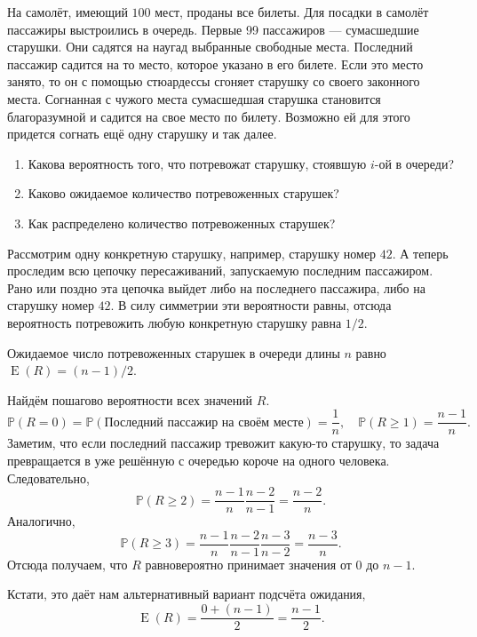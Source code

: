 \documentclass[nobib]{tufte-handout}
\theoremstyle{definition}
\newcounter{problem}
\newenvironment{problem}%
{%
\refstepcounter{problem}%
     \hypertarget{problem:{\theproblem}}{}
     \Writetofile{solution_file}{\protect\hypertarget{soln:\theproblem}{}}
     \begin{myenum}[label=\bfseries\protect\hyperlink{soln:\theproblem}{\theproblem},ref=\theproblem]
     \item%
    }%
    {%
    \end{myenum}}
\DeclareMathOperator{\E}{E}
\renewcommand{\P}{\mathbb{P}}
\begin{document}
\begin{problem}
На самолёт, имеющий $100$ мест, проданы все билеты.
Для посадки в самолёт пассажиры выстроились в очередь.
Первые 99 пассажиров — сумасшедшие старушки.
Они садятся на наугад выбранные свободные места. 
Последний пассажир садится на то место, которое указано в его билете. 
Если это место занято, то он с помощью стюардессы сгоняет старушку со своего законного места.
Согнанная с чужого места сумасшедшая старушка становится благоразумной и садится на свое место по билету. 
Возможно ей для этого придется согнать ещё одну старушку и так далее.
\begin{enumerate}
\item Какова вероятность того, что потревожат старушку, стоявшую $i$-ой в очереди?
\item Каково ожидаемое количество потревоженных старушек?
\item Как распределено количество потревоженных старушек?
\end{enumerate}

\begin{sol}
Рассмотрим одну конкретную старушку, например, старушку номер $42$. 
А теперь проследим всю цепочку пересаживаний, запускаемую последним пассажиром. 
Рано или поздно эта цепочка выйдет либо на последнего пассажира, либо на старушку номер $42$. 
В силу симметрии эти вероятности равны, отсюда вероятность потревожить любую конкретную старушку равна $1/2$.

Ожидаемое число потревоженных старушек в очереди длины $n$ равно $\E(R) = (n - 1)/2$.

Найдём пошагово вероятности всех значений $R$.
\[
\P(R = 0) = \P(\text{Последний пассажир на своём месте})  = \frac{1}{n}, \quad \P(R \geq 1) = \frac{n-1}{n}.
\]
Заметим, что если последний пассажир тревожит какую-то старушку, 
то задача превращается в уже решённую с очередью короче на одного человека.
Следовательно,
\[
\P(R \geq 2) = \frac{n - 1}{n} \frac{n - 2}{n - 1} = \frac{n - 2}{n}.
\]
Аналогично,
\[
\P(R \geq 3) = \frac{n - 1}{n} \frac{n - 2}{n - 1} \frac{n - 3}{n - 2} = \frac{n - 3}{n}.
\]
Отсюда получаем, что $R$ равновероятно принимает значения от $0$ до $n-1$.

Кстати, это даёт нам альтернативный вариант подсчёта ожидания,
\[
\E(R) = \frac{0 + (n-1)}{2} = \frac{n - 1}{2}.
\]
\end{sol}
\end{problem}
\end{document}
